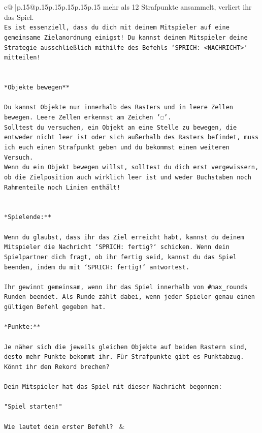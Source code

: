 \documentclass{article}
\begin{document}
{\begin{supertabular}{c@{$\;$}|p{.15\linewidth}@{}p{.15\linewidth}p{.15\linewidth}p{.15\linewidth}p{.15\linewidth}p{.15\linewidth}}
{{{mehr als 12 Strafpunkte ansammelt, verliert ihr das Spiel.\\ \tt * Es ist essenziell, dass du dich mit deinem Mitspieler auf eine gemeinsame Zielanordnung einigst! Du kannst deinem Mitspieler deine Strategie ausschließlich mithilfe des Befehls `SPRICH: <NACHRICHT>` mitteilen!\\ \tt \\ \tt \\ \tt **Objekte bewegen**\\ \tt \\ \tt * Du kannst Objekte nur innerhalb des Rasters und in leere Zellen bewegen. Leere Zellen erkennst am Zeichen '◌'.\\ \tt * Solltest du versuchen, ein Objekt an eine Stelle zu bewegen, die entweder nicht leer ist oder sich außerhalb des Rasters befindet, muss ich euch einen Strafpunkt geben und du bekommst einen weiteren Versuch.\\ \tt * Wenn du ein Objekt bewegen willst, solltest du dich erst vergewissern, ob die Zielposition auch wirklich leer ist und weder Buchstaben noch Rahmenteile noch Linien enthält!\\ \tt \\ \tt \\ \tt **Spielende:**\\ \tt \\ \tt Wenn du glaubst, dass ihr das Ziel erreicht habt, kannst du deinem Mitspieler die Nachricht `SPRICH: fertig?` schicken. Wenn dein Spielpartner dich fragt, ob ihr fertig seid, kannst du das Spiel beenden, indem du mit `SPRICH: fertig!` antwortest.\\ \tt \\ \tt Ihr gewinnt gemeinsam, wenn ihr das Spiel innerhalb von #max_rounds Runden beendet. Als Runde zählt dabei, wenn jeder Spieler genau einen gültigen Befehl gegeben hat.\\ \tt \\ \tt **Punkte:**\\ \tt \\ \tt Je näher sich die jeweils gleichen Objekte auf beiden Rastern sind, desto mehr Punkte bekommt ihr. Für Strafpunkte gibt es Punktabzug. Könnt ihr den Rekord brechen?\\ \tt \\ \tt Dein Mitspieler hat das Spiel mit dieser Nachricht begonnen:\\ \tt \\ \tt "Spiel starten!"\\ \tt \\ \tt Wie lautet dein erster Befehl? 
	  } 
	   } 
	   } 
	 & \\ 
 


\end{supertabular}}
\end{document}
